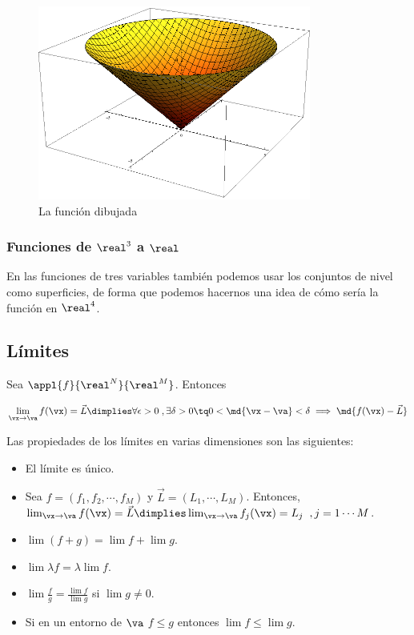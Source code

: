 \documentclass[nochap]{apuntes}
\begin{document}
\begin{figure}[hbtp]    
	\begin{center} 
		\includegraphics[width=0.8\textwidth]{img/Cono2.png}  
		\caption{La función dibujada} 
	\end{center}  
\end{figure}

\subsubsection{Funciones de $\real^3$ a $\real$}

En las funciones de tres variables también podemos usar los conjuntos de nivel como superficies, de forma que podemos hacernos una idea de cómo sería la función en $\real^4$.

\subsection{Límites}

\begin{defn}[Límite]Sea $\appl{f}{\real^N}{\real^M}$. Entonces

\[ \lim_{\vx\to\va} f(\vx) = \vec{L} \dimplies \forall \epsilon >0\; , \exists \delta > 0 \tq 0<\md{\vx-\va} < \delta \implies \md{f(\vx ) - \vec{L}} \]

\end{defn}


Las propiedades de los límites en varias dimensiones son las siguientes:

\begin{itemize}
\item El límite es único.
\item Sea $f=(f_1, f_2,\cdots, f_M)$ y $\vec{L} = (L_1, \cdots, L_M)$. Entonces, $\lim_{\vx\to\va} f(\vx) = \vec{L} \dimplies \lim_{\vx\to\va} f_j(\vx) = L_j\;\; , j=1\cdots M$.
\item $\lim (f+g) = \lim f +\lim g$.
\item $\lim \lambda f = \lambda \lim f$.
\item $\lim \frac{f}{g} = \frac{\lim f}{\lim g}$ si $\lim g \neq 0$.
\item Si en un entorno de $\va$ $f\leq g$ entonces $\lim f \leq \lim g$.
\end{itemize}
\end{document}
